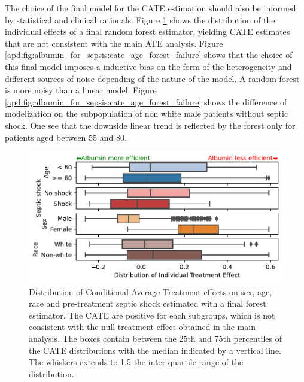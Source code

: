 \documentclass[french,12pt,twoside,a4paper]{book}
\begin{document}
\begin{appendices}
  The choice of the final model for the CATE estimation should also be informed
  by statistical and clinical rationals. Figure
  \ref{apd:fig:albumin_for_sepsis:cate_boxplot_forest} shows the distribution of
  the individual effects of a final random forest estimator, yielding CATE
  estimates that are not consistent with the main ATE analysis. Figure
  \ref{apd:fig:albumin_for_sepsis:cate_age_forest_failure} shows that the choice
  of this final model imposes a inductive bias on the form of the heterogeneity
  and different sources of noise depending of the nature of the model. A random
  forest is more noisy than a linear model. Figure
  \ref{apd:fig:albumin_for_sepsis:cate_age_forest_failure} shows the difference
  of modelization on the subpopulation of non white male patients without septic
  shock. One see that the downside linear trend is reflected by the
  forest only for patients aged between 55 and 80.

  \begin{figure}[!h]
    \centering
    \includegraphics[width=0.8\linewidth]{img/chapter_4/boxplot_est__DML__nuisances__Forests__final_RandomForestRegressor.pdf}
    \caption{Distribution of Conditional Average Treatment effects on sex, age,
      race and pre-treatment septic shock estimated with a final forest
      estimator. The CATE are positive for each subgroups, which is not
      consistent with the null treatment effect obtained in the main analysis.
      The boxes contain between the 25th and 75th percentiles of the CATE
      distributions with the median indicated by a vertical line. The whiskers
      extends to 1.5 the inter-quartile range of the
      distribution.}\label{apd:fig:albumin_for_sepsis:cate_boxplot_forest}
  \end{figure}


\end{appendices}
\end{document}

